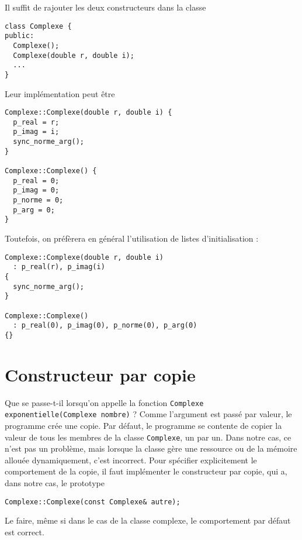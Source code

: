 \documentclass{book}
\newcommand{\inline}[1]{\texttt{#1}}
\begin{document}

\begin{correction}
Il suffit de rajouter les deux constructeurs dans la classe
\begin{verbatim}
class Complexe {
public:
  Complexe();
  Complexe(double r, double i);
  ...
}
\end{verbatim}
Leur implémentation peut être
\begin{verbatim}
Complexe::Complexe(double r, double i) {
  p_real = r;
  p_imag = i;
  sync_norme_arg();
}

Complexe::Complexe() {
  p_real = 0;
  p_imag = 0;
  p_norme = 0;
  p_arg = 0;
}
\end{verbatim}

Toutefois, on préfèrera en général l'utilisation de listes d'initialisation :

\begin{verbatim}  
Complexe::Complexe(double r, double i)
  : p_real(r), p_imag(i)
{
  sync_norme_arg();
}

Complexe::Complexe()
  : p_real(0), p_imag(0), p_norme(0), p_arg(0)
{}

\end{verbatim}

\end{correction}

\section{Constructeur par copie}

Que se passe-t-il lorsqu'on appelle la fonction \inline{Complexe exponentielle(Complexe nombre)} ? Comme l'argument est passé par valeur, le programme crée une copie. Par défaut, le programme se contente de copier la valeur de tous les membres de la classe \inline{Complexe}, un par un. Dans notre cas, ce n'est pas un problème, mais lorsque la classe gère une ressource ou de la mémoire allouée dynamiquement, c'est incorrect. Pour spécifier explicitement le comportement de la copie, il faut implémenter le constructeur par copie, qui a, dans notre cas, le prototype
\begin{verbatim}
Complexe::Complexe(const Complexe& autre);
\end{verbatim}
Le faire, même si dans le cas de la classe complexe, le comportement par défaut est correct. \\
\end{document}
